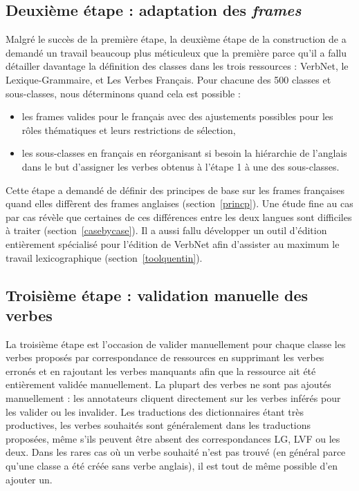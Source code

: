 \subsection{Deuxième étape : adaptation des \textit{frames}}\label{second}

Malgré le succès de la première étape, la deuxième étape de la construction de
\verbenet{} a demandé un travail beaucoup plus méticuleux que la première parce
qu'il a fallu détailler davantage la définition des classes dans les trois
ressources : VerbNet, le Lexique-Grammaire, et Les Verbes Français. Pour
chacune des 500 classes et sous-classes, nous déterminons quand cela est
possible :

\begin{itemize}
    \item les frames valides pour le français avec des ajustements possibles
        pour les rôles thématiques et leurs restrictions de sélection,
    \item les sous-classes en français en réorganisant si besoin la hiérarchie
        de l'anglais dans le but d'assigner les verbes obtenus à l'étape 1 à
        une des sous-classes.
\end{itemize}

Cette étape a demandé de définir des principes de base sur les frames
françaises quand elles diffèrent des frames anglaises (section~\ref{princp}).
Une étude fine au cas par cas révèle que certaines de ces différences entre les
deux langues sont difficiles à traiter (section~\ref{casebycase}). Il a aussi
fallu développer un outil d'édition entièrement spécialisé pour l'édition de
VerbNet afin d'assister au maximum le travail lexicographique
(section~\ref{toolquentin}).

\subsection{Troisième étape : validation manuelle des verbes}
\label{third}

La troisième étape est l'occasion de valider manuellement pour chaque classe
les verbes proposés par correspondance de ressources en supprimant les verbes
erronés et en rajoutant les verbes manquants afin que la ressource ait été
entièrement validée manuellement. La plupart des verbes ne sont pas ajoutés
manuellement : les annotateurs cliquent directement sur les verbes inférés pour
les valider ou les invalider.  Les traductions des dictionnaires étant très
productives, les verbes souhaités sont généralement dans les traductions
proposées, même s'ils peuvent être absent des correspondances LG, LVF ou les
deux. Dans les rares cas où un verbe souhaité n'est pas trouvé (en général
parce qu'une classe a été créée sans verbe anglais), il est tout de même
possible d'en ajouter un.

